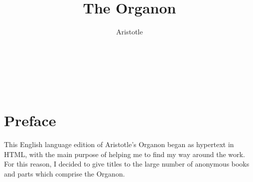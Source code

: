 \title{The Organon}
\author{Aristotle}
\date{\ }



\renewcommand{\thepart}{Volume \arabic{part}}
\renewcommand{\thechapter}{Book \Roman{chapter}}
\renewcommand{\thesection}{Part \arabic{section}:}

\addtolength{\cftpartnumwidth}{2em}
\addtolength{\cftchapnumwidth}{4em}
\addtolength{\cftsecnumwidth}{2em}

\frontmatter

\begin{titlepage}
\maketitle

\ 
\\

\vfill

\begin{centering}

{\footnotesize






}%

\end{centering}


\thispagestyle{empty}
\end{titlepage}


{\parskip=0pt\tableofcontents}


\pagebreak

\chapter*{Preface}

This English language edition of Aristotle's Organon began as hypertext in HTML, with
the main purpose of helping me to find my way around the work.
For this reason, I decided to give titles to the large number of
anonymous books and parts which comprise the Organon.

